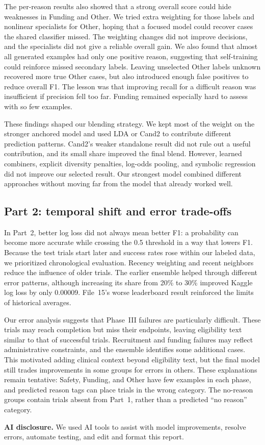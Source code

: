 \documentclass[10pt,twocolumn,letterpaper]{article}
\begin{document}
The per-reason results also showed that a strong overall score could hide
weaknesses in Funding and Other. We tried extra weighting for those labels
and nonlinear specialists for Other, hoping that a focused model could recover
cases the shared classifier missed. The weighting changes did not improve
decisions, and the specialists did not give a reliable overall gain. We also
found that almost all generated examples had only one positive reason,
suggesting that self-training could reinforce missed secondary labels.
Leaving unselected Other labels unknown recovered more true Other cases, but
also introduced enough false positives to reduce overall F1. The lesson was
that improving recall for a difficult reason was insufficient if precision
fell too far. Funding remained especially hard to assess with so few examples.

These findings shaped our blending strategy. We kept most of the weight on
the stronger anchored model and used LDA or Cand2 to contribute different
prediction patterns. Cand2's weaker standalone result did not rule out a
useful contribution, and its small share improved the final blend. However,
learned combiners, explicit diversity penalties, log-odds pooling, and symbolic
regression did not improve our selected result. Our strongest model combined different approaches without moving far from the
model that already worked well.

\subsection{Part 2: temporal shift and error trade-offs}

In Part~2, better log loss did not always mean better F1: a probability can
become more accurate while crossing the 0.5 threshold in a way that lowers F1.
Because the test trials start later and success rates rose within our labeled
data, we prioritized chronological evaluation. Recency
weighting and recent neighbors reduce the influence of older trials. The
earlier ensemble helped through different error patterns, although increasing
its share from 20\% to 30\% improved Kaggle log loss by only 0.00009. File~15's
worse leaderboard result reinforced the limits of historical averages.

Our error analysis suggests that Phase~III failures are particularly difficult.
These trials may reach completion but miss their endpoints, leaving eligibility
text similar to that of successful trials. Recruitment and funding failures
may reflect administrative constraints, and the ensemble identifies some
additional cases. This motivated adding clinical context beyond eligibility
text, but the final model still trades improvements in some groups for errors
in others. These
explanations remain tentative: Safety, Funding, and Other have few examples in
each phase, and predicted reason tags can place trials in the wrong category.
The no-reason groups contain trials absent from Part~1, rather than a predicted
``no reason'' category.

\smallskip
\noindent\textbf{AI disclosure.}
We used AI tools to assist with model improvements, resolve errors, automate
testing, and edit and format this report.

{
    \small
    
    
}
\end{document}
